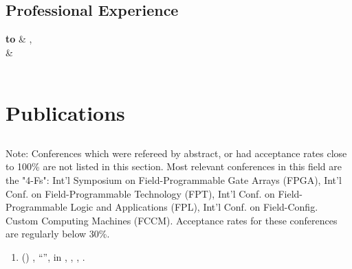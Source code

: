 \documentclass[10pt, oneside]{article}
\begin{document}
\begin{center}

    \section{Professional Experience}
    \textbf{ to}      & \textbf{}, \emph{} \\
    \textbf{} &  \\
    \\
    
  \end{center}
  

    \section*{Publications}

    \subsection*{}
    Note:  Conferences which were refereed by abstract, or had acceptance rates close to 100\% are not listed in this section.  Most relevant conferences in this field are the "4-Fs": Int'l Symposium on Field-Programmable Gate Arrays (FPGA), Int'l Conf. on Field-Programmable Technology (FPT), Int'l Conf. on Field-Programmable Logic and Applications (FPL), Int'l Conf. on Field-Config. Custom Computing Machines (FCCM).  Acceptance rates for these conferences are regularly below 30\%. 
    
    \begin{enumerate}[resume]
      
      \item {}(\textit{}) , ``'', in , , , .
    \end{enumerate}
\end{document}
